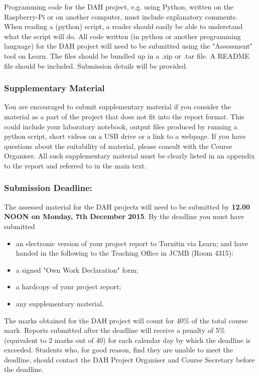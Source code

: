 Programming code for the DAH project, e.g. using Python, written on the Raspberry-Pi or on another computer, must include explanatory comments. When reading a (python) script, a reader should easily be able to understand what the script will do. All code written (in python or another programming language)  for the DAH project will need to be submitted using the "Assessment" tool on Learn.  The files should be bundled up in a .zip or .tar file. A README file should be included. Submission details will be provided.

\subsubsection{Supplementary Material}

You are encouraged to submit supplementary material if you consider the material as a part of the project that does not fit into the report format. This could include your laboratory notebook, output files produced by running a python script, short videos on a USB drive or a link to a webpage. If you have questions about the suitability of material, please consult with the Course Organiser. All such supplementary material must be clearly listed in an appendix to the report and referred to in the main text. 

\subsubsection{Submission Deadline:}
The assessed material for the DAH projects will need to be submitted by {\bf 12.00 NOON on Monday, 7th December 2015}. By the deadline you must have submitted 
\begin{itemize}
\item an electronic version of your project report to Turnitin via Learn;
and have handed in the following to the Teaching Office in JCMB (Room 4315):
\item a signed "Own Work Declaration" form;
\item a hardcopy of your project report;
\item any supplementary material. 
\end{itemize}
The marks obtained for the DAH project will count for 40\% of the total course mark. 
Reports submitted after the deadline will receive a penalty of 5\% (equivalent to 2 marks out of 40) for each calendar day by which the deadline is exceeded. Students who, for good reason, find they are unable to meet the deadline, should contact the DAH Project Organiser and Course Secretary before
the deadline.

